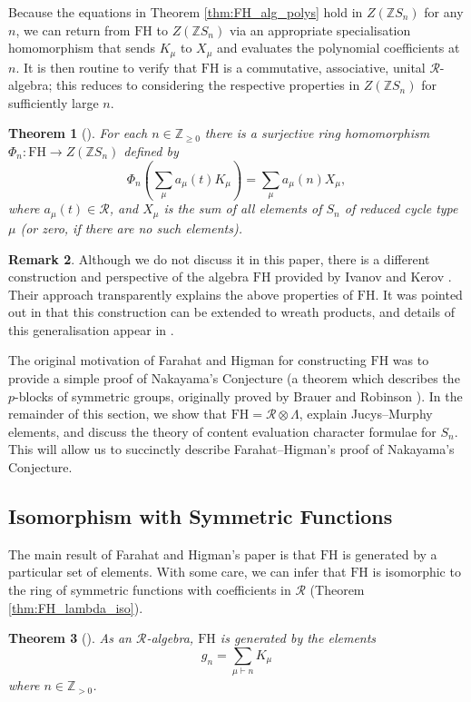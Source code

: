 \documentclass[10pt]{article}
\newtheorem{theorem}{Theorem}[section]
\theoremstyle{definition}
\newtheorem{remark}[theorem]{Remark}
\newcommand{\FH}{\mathrm{FH}}
\begin{document}
Because the equations in Theorem \ref{thm:FH_alg_polys} hold in $Z(\mathbb{Z}S_n)$ for any $n$, we can return from $\FH$ to $Z(\mathbb{Z}S_n)$ via an appropriate specialisation homomorphism that sends $K_\mu$ to $X_\mu$ and evaluates the polynomial coefficients at $n$. It is then routine to verify that $\FH$ is a commutative, associative, unital $\mathcal{R}$-algebra; this reduces to considering the respective properties in $Z(\mathbb{Z}S_n)$ for sufficiently large $n$. 

\begin{theorem}[{\cite[Theorem 2.4]{FarahatHigman}}] \label{thm:FH_spec_hom}
For each $n \in \mathbb{Z}_{\geq 0}$ there is a surjective ring homomorphism $\Phi_n: \FH \to Z(\mathbb{Z}S_n)$ defined by
\[
\Phi_n \left( \sum_{\mu} a_\mu(t) K_\mu \right) = \sum_{\mu} a_\mu(n) X_\mu,
\]
where $a_\mu(t) \in \mathcal{R}$, and $X_\mu$ is the sum of all elements of $S_n$ of reduced cycle type $\mu$ \textup{(}or zero, if there are no such elements\textup{)}.
\end{theorem}
\begin{remark}
Although we do not discuss it in this paper, there is a different construction and perspective of the algebra $\FH$ provided by Ivanov and Kerov \cite{IvanovKerov}. Their approach transparently explains the above properties of $\FH$. It was pointed out in \cite{Wang2} that this construction can be extended to wreath products, and details of this generalisation appear in \cite{Tout}.
\end{remark}

The original motivation of Farahat and Higman for constructing $\FH$ was to provide a simple proof of Nakayama's Conjecture (a theorem which describes the $p$-blocks of symmetric groups, originally proved by Brauer and Robinson \cite{BrauerRobinson}). In the remainder of this section, we show that $\FH = \mathcal{R} \otimes \Lambda$, explain Jucys--Murphy elements, and discuss the theory of content evaluation character formulae for $S_n$. This will allow us to succinctly describe Farahat--Higman's proof of Nakayama's Conjecture.

\subsection{Isomorphism with Symmetric Functions}
The main result of Farahat and Higman's paper is that $\FH$ is generated by a particular set of elements. With some care, we can infer that $\FH$ is isomorphic to the ring of symmetric functions with coefficients in $\mathcal{R}$ (Theorem \ref{thm:FH_lambda_iso}).
\begin{theorem}[{\cite[Theorem 2.5]{FarahatHigman}}] \label{thm:FH_generation_thm}
As an $\mathcal{R}$-algebra, $\FH$ is generated by the elements
\[
g_n = \sum_{\mu \vdash n} K_\mu
\]
where $n \in \mathbb{Z}_{>0}$.
\end{theorem}
\end{document}
